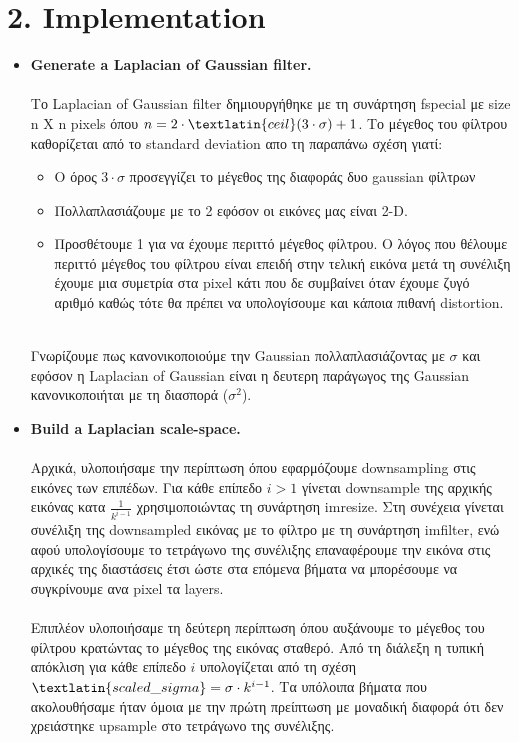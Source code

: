 \documentclass{article}
\newcommand{\tl}[1]{\textlatin{#1}}
\begin{document}
	\section*{2. \tl{Implementation}}
	\begin{itemize}
		\item \textbf{\tl{Generate a Laplacian of Gaussian filter.}}\\\\ \noindent 
		Το \tl{Laplacian of Gaussian filter}  δημιουργήθηκε με τη συνάρτηση \tl{fspecial} με \tl{size} \tl{n X n pixels} όπου $n=2\cdot\tl{ceil}(3\cdot\sigma) +1$.  Το μέγεθος του φίλτρου καθορίζεται από το \tl{standard deviation} απο τη παραπάνω σχέση γιατί:
		\begin{itemize}
			\item Ο όρος $3\cdot \sigma$ προσεγγίζει το μέγεθος της διαφοράς δυο \tl{gaussian} φίλτρων
			\item Πολλαπλασιάζουμε με το 2 εφόσον οι εικόνες μας είναι \tl{2-D}.
			\item Προσθέτουμε 1 για να έχουμε περιττό μέγεθος φίλτρου. Ο λόγος που θέλουμε περιττό μέγεθος του φίλτρου είναι επειδή στην τελική εικόνα μετά τη συνέλιξη 
			έχουμε μια συμετρία στα \tl{pixel} κάτι που δε συμβαίνει όταν έχουμε ζυγό αριθμό καθώς τότε θα πρέπει να υπολογίσουμε και κάποια πιθανή \tl{distortion}.
		\end{itemize}
		\ \\
		\noindent 
		Γνωρίζουμε πως κανονικοποιούμε την \tl{Gaussian} πολλαπλασιάζοντας με $\sigma$ και εφόσον η \tl{Laplacian of Gaussian} είναι η δευτερη
		παράγωγος της \tl{Gaussian} κανονικοποιήται με τη διασπορά ($\sigma^2$). \\
		\item \textbf{\tl{Build a Laplacian scale-space.}}\\\\ \noindent 
		Αρχικά, υλοποιήσαμε την περίπτωση όπου εφαρμόζουμε \tl{downsampling} στις εικόνες των επιπέδων. Για κάθε επίπεδο $i > 1$ γίνεται \tl{downsample} της αρχικής εικόνας κατα $\frac{1}{k^{i-1}}$
		χρησιμοποιώντας τη συνάρτηση \tl{imresize}. Στη συνέχεια γίνεται συνέλιξη της \tl{downsampled} εικόνας με το φίλτρο με τη συνάρτηση \tl{imfilter}, ενώ αφού υπολογίσουμε το τετράγωνο της συνέλιξης επαναφέρουμε την εικόνα στις αρχικές της διαστάσεις έτσι ώστε στα επόμενα βήματα να μπορέσουμε να συγκρίνουμε ανα \tl{pixel} τα \tl{layers}.\\\\
		\noindent
		Επιπλέον υλοποιήσαμε τη δεύτερη περίπτωση όπου αυξάνουμε το μέγεθος του φίλτρου κρατώντας το μέγεθος της εικόνας σταθερό. Από τη διάλεξη η τυπική απόκλιση για κάθε επίπεδο $i$ υπολογίζεται από τη σχέση $\tl{scaled\_sigma} = \sigma \cdot k^{i-1}$. Tα υπόλοιπα βήματα που ακολουθήσαμε ήταν όμοια με την πρώτη πρείπτωση με μοναδική διαφορά ότι δεν χρειάστηκε \tl{upsample} στο τετράγωνο της συνέλιξης.

\end{itemize}
\end{document}
